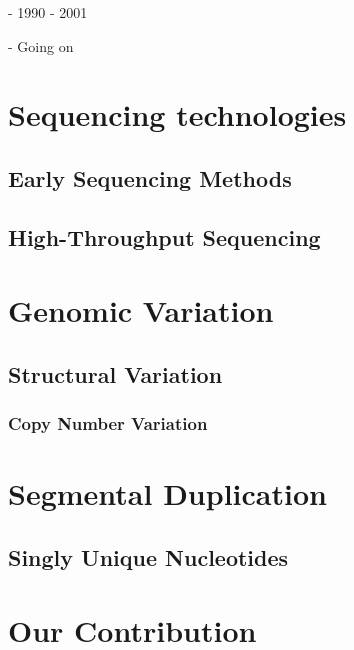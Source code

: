     - 1990 - 2001
    
    - Going on

\section{Sequencing technologies}

\subsection{Early Sequencing Methods}
\subsection{High-Throughput Sequencing}
\section{Genomic Variation}
\subsection{Structural Variation}
\subsubsection{Copy Number Variation}
\section{Segmental Duplication}
\subsection{Singly Unique Nucleotides}
\section{Our Contribution}
\newpage
